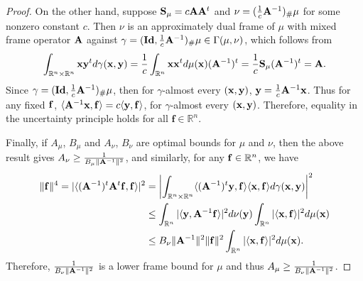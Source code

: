 \documentclass[10pt,a4paper]{amsart}
\begin{document}
\begin{proof}
On the other hand, suppose ${\bf S}_{\mu}=c{\bf A}{\bf A}^{t}$ and
$\nu=(\frac{1}{c}{\bf A}^{-1})_{\#}\mu$ for some nonzero constant $c$.
Then $\nu$ is an approximately dual frame of $\mu$ with mixed frame operator ${\bf A}$ against $\gamma = (\mathbf{Id}, \frac{1}{c}{\bf A}^{-1})_\#\mu \in \Gamma(\mu, \nu)$, which follows from 
   $$   \int_{\mathbb{R}^n \times \mathbb{R}^n} {\bf x} {\bf y}^t d\gamma({\bf x, y}) = \frac{1}{c} \int_{\mathbb{R}^n} {\bf x} {\bf x}^t d\mu({\bf x}) ({\bf A}^{-1})^t = \frac{1}{c} {\bf S}_{\mu} ({\bf A}^{-1})^t = {\bf A}.
   $$
Since  $\gamma = (\mathbf{Id}, \frac{1}{c}{\bf A}^{-1})_\#\mu$, then for $\gamma$-almost every $({\bf x},{\bf y})$, ${\bf y}=\frac{1}{c}{\bf A}^{-1}{\bf x}$. Thus for any fixed ${\bf f}$, 
$\langle {\bf A}^{-1}{\bf x},{\bf f}\rangle
= c \langle {\bf y},{\bf f}\rangle$, for $\gamma$-almost every $({\bf x},{\bf y})$. 
Therefore, equality in the uncertainty principle holds for all $\mathbf{f} \in \mathbb{R}^n$. 


 Finally, if $A_\mu$, $B_\mu$ and $A_\nu$, $B_\nu$ are optimal bounds for $\mu$ and $\nu$, then the above result gives $ A_\nu \geq \frac{1}{B_\mu \| {\bf A}^{-1}\|^2}$, and similarly,  for any ${\bf f} \in \mathbb{R}^n$, we have 
   \begin{equation*}
   \begin{split}
       \|{\bf f}\|^4  = |\langle ({\bf A}^{-1})^t{\bf A}^t{\bf f}, {\bf f} \rangle|^2 &= \left|\int_{\mathbb{R}^n \times \mathbb{R}^n} \langle ({\bf A}^{-1})^t {\bf y}, {\bf f} \rangle \langle {\bf x,f} \rangle d\gamma({\bf x, y}) \right |^2 \\
       & \leq  \int_{\mathbb{R}^n} |\langle {\bf y}, {\bf A}^{-1} {\bf f} \rangle |^2 d\nu({\bf y}) \int_{\mathbb{R}^n} |\langle {\bf x}, {\bf f} \rangle |^2 d\mu({\bf x})\\
       &\leq B_\nu \|{\bf A }^{-1}\|^2 \| {\bf f}\|^2 \int_{\mathbb{R}^n} |\langle {\bf x}, {\bf f} \rangle |^2 d\mu({\bf x}).
   \end{split}
   \end{equation*}
Therefore, $\frac{1}{B_\nu \| {\bf A}^{-1}\|^2}$ is a lower frame bound for $\mu$ and thus $A_\mu \geq \frac{1}{B_\nu \| {\bf A}^{-1}\|^2}$.
\end{proof}
\end{document}
